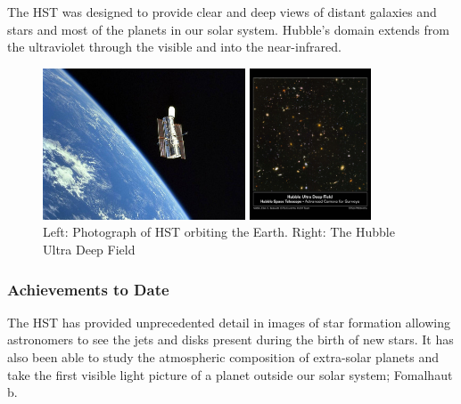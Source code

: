 		The HST was designed to provide clear and deep views of distant galaxies and stars and most of the planets in our solar system. Hubble's domain extends from the ultraviolet through the visible and into the near-infrared\cite{NASA_1}.
		\begin{figure}[htbp]
			\begin{minipage}[c]{0.5\linewidth}
				\centering
				\includegraphics[height=4.5cm]{../Images/Hubble_Space_Telescope.jpg}
			\end{minipage}
			\begin{minipage}[c]{0.5\linewidth}
				\centering
				\includegraphics[trim = 10mm 80mm 10mm 35mm, clip, height=4.5cm]{../Images/HUDF.png}
			\end{minipage}
			\caption{Left: Photograph of HST orbiting the Earth. Right: The Hubble Ultra Deep Field}\label{fig:hubble_space_telescope}
		\end{figure}

	\subsubsection{Achievements to Date} %
	\label{ssub:achievements_to_date}
		The HST has provided unprecedented detail in images of star formation allowing astronomers to see the jets and disks present during the birth of new stars. It has also been able to study the atmospheric composition of extra-solar planets and take the first visible light picture of a planet outside our solar system; Fomalhaut b\cite{Hubsite_3}.


